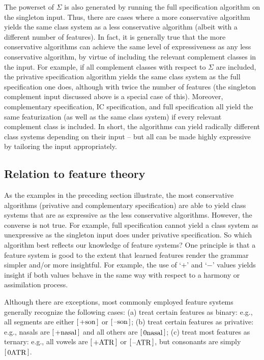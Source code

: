 \documentclass[12pt, oneside]{article}   	%
\newcommand{\featmat}[1]
{$\begin{bsmallmatrix*}[l]\text{\normalsize #1}\end{bsmallmatrix*}$}
\begin{document}
The powerset of $\Sigma$ is also generated by running the full specification algorithm on the singleton input. Thus, there are cases where a more conservative algorithm yields the same class system as a less conservative algorithm (albeit with a different number of features). In fact, it is generally true that the more conservative algorithms can achieve the same level of expressiveness as any less conservative algorithm, by virtue of including the relevant complement classes in the input. For example, if all complement classes with respect to $\Sigma$ are included, the privative specification algorithm yields the same class system as the full specification one does, although with twice the number of features (the singleton complement input discussed above is a special case of this). Moreover, complementary specification, IC specification, and full specification all yield the same featurization (as well as the same class system) if every relevant complement class is included. In short, the algorithms can yield radically different class systems depending on their input -- but all can be made highly expressive by tailoring the input appropriately.

\subsection{Relation to feature theory}

As the examples in the preceding section illustrate, the most conservative algorithms (privative and complementary specification) are able to yield class systems that are as expressive as the less conservative algorithms. However, the converse is not true. For example, full specification cannot yield a class system as unexpressive as the singleton input does under privative specification. So which algorithm best reflects our knowledge of feature systems? One principle is that a feature system is good to the extent that learned features render the grammar simpler and/or more insightful. For example, the use of `$+$' and `$-$' values yields insight if both values behave in the same way with respect to a harmony or assimilation process.

Although there are exceptions, most commonly employed feature systems generally recognize the following cases: (a) treat certain features as binary: e.g., all segments are either \featmat{+son} or \featmat{--son}; (b) treat certain features as privative: e.g., nasals are \featmat{+nasal} and all others are \featmat{0nasal}; (c) treat most features as ternary: e.g., all vowels are \featmat{+ATR} or \featmat{--ATR}, but consonants are simply \featmat{0ATR}.
\end{document}
